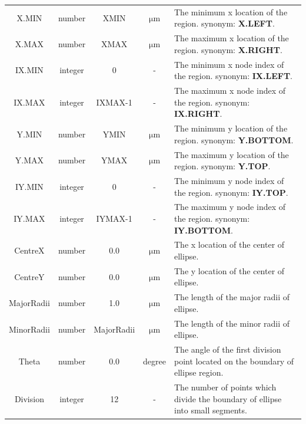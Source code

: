 \documentclass[11pt,pdftex]{article}
\begin{document}
\begin{longtable}{ccccp{8.5cm}}
X.MIN       & number  & XMIN    & $\mathrm{\mu m}$     & The minimum x location of the region.
                                                         synonym: \textbf{X.LEFT}. \\
X.MAX       & number  & XMAX    & $\mathrm{\mu m}$     & The maximum x location of the region.
                                                         synonym: \textbf{X.RIGHT}. \\
IX.MIN      & integer & 0       & -                    & The minimum x node index of the region.
                                                         synonym: \textbf{IX.LEFT}.\\
IX.MAX      & integer & IXMAX-1 &-                     & The maximum x node index of the region.
                                                         synonym: \textbf{IX.RIGHT}. \\
Y.MIN       & number  & YMIN    & $\mathrm{\mu m}$     & The minimum y location of the region.
                                                         synonym: \textbf{Y.BOTTOM}. \\
Y.MAX       & number  & YMAX    & $\mathrm{\mu m}$     & The maximum y location of the region.
                                                         synonym: \textbf{Y.TOP}. \\
IY.MIN      & integer & 0       & -                    & The minimum y node index of the region.
                                                         synonym: \textbf{IY.TOP}. \\
IY.MAX      & integer & IYMAX-1 & -                    & The maximum y node index of the region.
                                                         synonym: \textbf{IY.BOTTOM}.\\
CentreX     & number  & 0.0     & $\mathrm{\mu m}$   & The x location of the center of ellipse. \\
CentreY     & number  & 0.0     & $\mathrm{\mu m}$   & The y location of the center of ellipse.\\
MajorRadii  & number  & 1.0     & $\mathrm{\mu m}$   & The length of the major radii of ellipse.\\
MinorRadii  & number  & MajorRadii     & $\mathrm{\mu m}$   & The length of the minor radii of ellipse.\\
Theta       & number  & 0.0     & degree               & The angle of the first division point located on the boundary of ellipse region.\\
Division    & integer & 12      & -                    & The number of points which divide the boundary of ellipse into small segments.
\end{longtable}
\normalsize
\end{document}
